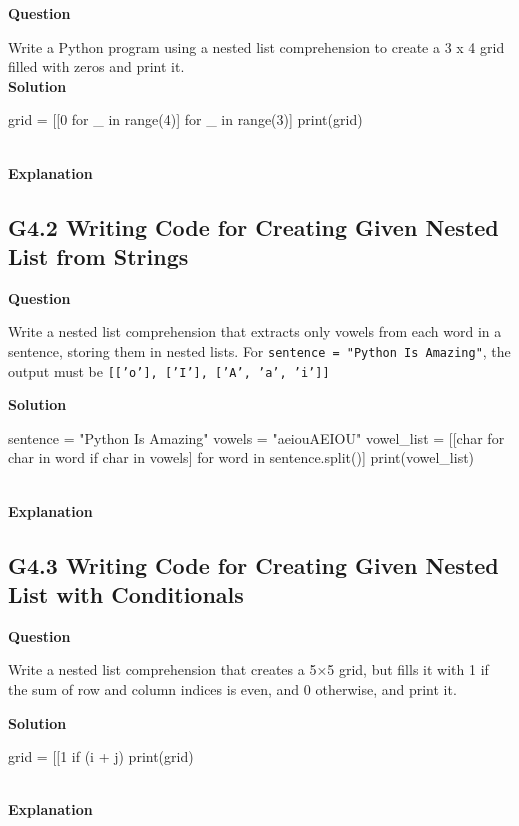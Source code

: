 \documentclass[10pt]{extarticle}
\begin{document}
\textbf{Question}

Write a Python program using a nested list comprehension to create a 3 x 4 grid filled with zeros and print it. \\

\noindent\textbf{Solution}

\begin{python}
grid = [[0 for _ in range(4)] for _ in range(3)]
print(grid)
\end{python}  \\

\noindent\textbf{Explanation}

\subsection*{G4.2 Writing Code for Creating Given Nested List from Strings}

\textbf{Question}

Write a nested list comprehension that extracts only vowels from each word in a sentence, storing them in nested lists. For \texttt{sentence = "Python Is Amazing"}, the output must be \texttt{[['o'], ['I'], ['A', 'a', 'i']]}

\noindent\textbf{Solution}

\begin{python}
sentence = "Python Is Amazing"
vowels = "aeiouAEIOU"
vowel_list = [[char for char in word if char in vowels] for word in sentence.split()]
print(vowel_list)
\end{python}  \\

\noindent\textbf{Explanation}

\subsection*{G4.3 Writing Code for Creating Given Nested List with Conditionals}

\textbf{Question}

Write a nested list comprehension that creates a 5×5 grid, but fills it with 1 if the sum of row and column indices is even, and 0 otherwise, and print it.

\noindent\textbf{Solution}

\begin{python}
grid = [[1 if (i + j) %
print(grid)
\end{python}  \\

\noindent\textbf{Explanation}
\end{document}
